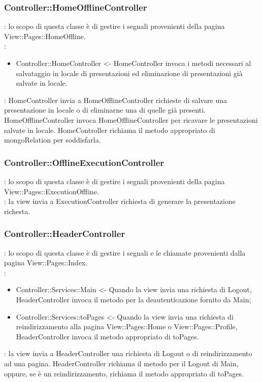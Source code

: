 {	\subsubsection{Controller::\-HomeOfflineController}{
					\textbf{\tipo}: lo scopo di questa classe è di gestire i segnali provenienti della pagina View::\-Pages::\-HomeOffline.\\	
					\textbf{\relaz}:
						\begin{itemize}
							\item Controller::HomeController <- HomeController invoca i metodi necessari al salvataggio in locale di presentazioni ed eliminazione di presentazioni già salvate in locale.
						\end{itemize}
						\textbf{\interfacce}: HomeController invia a HomeOfflineController richieste di salvare una presentazione in locale o di eliminarne una di quelle già presenti. 
						HomeOfflineController invoca HomeOfflineController per ricavare le presentazioni salvate in locale.
						HomeController richiama il metodo appropriato di mongoRelation per soddisfarla.
					}
		
		\subsubsection{Controller::\-OfflineExecutionController}{
				\textbf{\tipo}: lo scopo di questa classe è di gestire i segnali provenienti della pagina View::\-Pages::\-ExecutionOffline.\\	
				\textbf{\interfacce}: la view invia a ExecutionController richiesta di generare la presentazione richesta.
			}
		}
	
	\subsubsection{Controller::\-HeaderController}{
		\textbf{\tipo}: lo scopo di questa classe è di gestire i segnali e le chiamate provenienti dalla pagina View::\-Pages::\-Index.\\	
		\textbf{\relaz}:
		\begin{itemize}
			\item Controller::\-Services::\-Main <- Quando la view invia una richiesta di Logout, HeaderController invoca il metodo per la deautenticazione fornito da Main;
			\item Controller::\-Services::\-toPages <- Quando la view invia una richiesta di reindirizzamento alla pagina View::\-Pages::\-Home o View::\-Pages::\-Profile, HeaderController invoca il metodo appropriato di toPages.
		\end{itemize}
		\textbf{\interfacce}: la view invia a HeaderController una richiesta di Logout o di reindirizzamento ad una pagina. HeaderController richiama il metodo per il Logout di Main, oppure, se è un reindirizzamento, richiama il metodo appropriato di toPages.
	}

